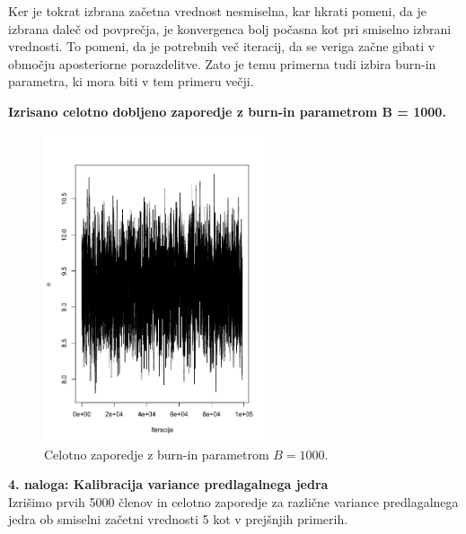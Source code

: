 \documentclass[a4paper,11pt]{article}
\begin{document}
\noindent
Ker je tokrat izbrana začetna vrednost nesmiselna, kar hkrati pomeni, da je izbrana daleč od povprečja, je konvergenca bolj počasna kot pri smiselno izbrani vrednosti. To pomeni, da je potrebnih več iteracij, da se veriga začne gibati v območju aposteriorne porazdelitve.
Zato je temu primerna tudi izbira burn-in parametra, ki mora biti v tem primeru večji.

\noindent
\textbf{Izrisano celotno dobljeno zaporedje z burn-in parametrom B = 1000.}
    \begin{figure}[ht!]
        \centering
        \includegraphics[width = 65mm]{Slike/3_3.png}
        \caption{Celotno zaporedje z burn-in parametrom $B = 1000$.}
    \end{figure}



\newpage
\noindent
\textbf{4. naloga: Kalibracija variance predlagalnega jedra}
\\
\noindent
Izrišimo prvih 5000 členov in celotno zaporedje za različne variance predlagalnega jedra ob smiselni začetni vrednosti 5 kot v prejšnjih primerih.  
\end{document}
